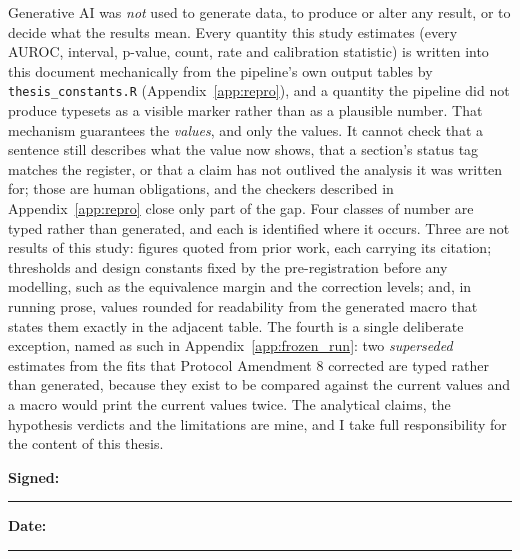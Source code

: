 Generative AI was \emph{not} used to generate data, to produce or alter any
result, or to decide what the results mean. Every quantity this study estimates
(every AUROC, interval, p-value, count, rate and calibration statistic) is
written into this document mechanically from the pipeline's own output tables
by \texttt{thesis\_constants.R} (Appendix~\ref{app:repro}), and a quantity the
pipeline did not produce typesets as a visible marker rather than as a
plausible number. That mechanism guarantees the \emph{values}, and only the
values. It cannot check that a sentence still describes what the value now
shows, that a section's status tag matches the register, or that a claim has
not outlived the analysis it was written for; those are human obligations, and
the checkers described in Appendix~\ref{app:repro} close only part of the gap.
Four classes of number are typed rather than generated, and each is identified
where it occurs. Three are not results of this study: figures quoted from prior
work, each carrying its citation; thresholds and design constants fixed by the
pre-registration before any modelling, such as the equivalence margin and the
correction levels; and, in running prose, values rounded for readability from
the generated macro that states them exactly in the adjacent table. The fourth
is a single deliberate exception, named as such in
Appendix~\ref{app:frozen_run}: two \emph{superseded} estimates from the fits
that Protocol Amendment 8 corrected are typed rather than generated, because
they exist to be compared against the current values and a macro would print
the current values twice. The
analytical claims, the hypothesis verdicts and the limitations are mine, and I
take full responsibility for the content of this thesis.

\vspace{1.5em}
\noindent\textbf{Signed:} \rule{6cm}{0.4pt} \hfill \textbf{Date:} \rule{3cm}{0.4pt}

\vspace{0.5em}
\noindent\reportauthor
